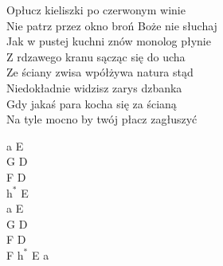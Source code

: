 \begin{text}
    Opłucz kieliszki po czerwonym winie\\
    Nie patrz przez okno broń Boże nie słuchaj\\
    Jak w pustej kuchni znów monolog płynie\\
    Z rdzawego kranu sącząc się do ucha\\
    Ze ściany zwisa wpółżywa natura stąd\\
    Niedokładnie widzisz zarys dzbanka\\
    Gdy jakaś para kocha się za ścianą\\
    Na tyle mocno by twój płacz zagłuszyć
\end{text}
\begin{chord}
    a E\\
    G D\\
    F D\\
    $\mathrm{h^*}$ E\\
    a E\\
    G D\\
    F D\\
    F $\mathrm{h^*}$ E a
\end{chord}
